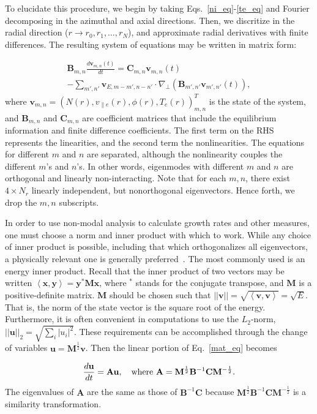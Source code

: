 \documentclass[letter,scriptaddress,twocolumn, prl,showkeys]{revtex4}
\def\beq{\begin{equation}}
\def\eeq{\end{equation}}
\def\beqar{\begin{eqnarray}}
\def\eeqar{\end{eqnarray}}
\newcommand{\diff}[2]{\frac{d#1}{d#2}}
\def\grad{\nabla}
\newcommand{\gradperp}{\grad_\perp}
\newcommand{\vpe}{v_{\parallel e}}
\begin{document}
To elucidate this procedure, we begin by taking Eqs.~\ref{ni_eq}-\ref{te_eq} and Fourier decomposing in the azimuthal and axial directions.
Then, we discritize in the radial direction ($r \rightarrow r_0, r_1, \ldots, r_N $), and approximate radial derivatives with finite differences. 
The resulting system of equations may be written in matrix form:

\beqar
\label{mat_eq}
\mathbf{B}_{m,n} \diff{\mathbf{v}_{m,n}(t)}{t} = \mathbf{C}_{m,n} \mathbf{v}_{m,n}(t) \nonumber \\
- \sum_{m',n'}  \mathbf{v}_{E,m-m',n-n'} \cdot \gradperp \left( \mathbf{B}_{m',n'} \mathbf{v}_{m',n'}(t) \right),
\eeqar
where $\mathbf{v}_{m,n} = \left( N(r), \vpe(r), \phi(r), T_e(r) \right)_{m,n}^{T}$ is the state of the system,
and $\mathbf{B}_{m,n}$ and $\mathbf{C}_{m,n}$ are coefficient matrices that include the equilibrium information and finite difference coefficients. The first term on the RHS represents the linearities,
and the second term the nonlinearities.
The equations for different $m$ and $n$ are separated, although the nonlinearity couples the different $m$'s and $n$'s. 
In other words, eigenmodes with different $m$ and $n$ are orthogonal and linearly non-interacting. Note that for each $m,n$, there exist $4 \times N_r$ linearly
independent, but nonorthogonal eigenvectors. Hence forth, we drop the $m,n$ subscripts.

In order to use non-modal analysis to calculate growth rates and other measures, one must choose a norm and inner product with which to work. While any choice of
inner product is possible, including that which orthogonalizes all eigenvectors, a physically relevant one is generally preferred~\cite{camargo1998,schmid2007,camporeale2010}. The most commonly used
is an energy inner product. Recall that the inner product of two vectors may be written $\left< \mathbf{x},\mathbf{y} \right> = \mathbf{y}^{*} \mathbf{M} \mathbf{x}$,
where $^*$ stands for the conjugate transpose, and $\mathbf{M}$ is a positive-definite matrix. $\mathbf{M}$ should be chosen such that 
$||\mathbf{v}|| = \sqrt{\left< \mathbf{v},\mathbf{v} \right>} = \sqrt{E}$. That is, the norm of the state vector is the square root of the energy. Furthermore, it is often convenient in
computations to use the $L_2$-norm, $||\mathbf{u}||_2 = \sqrt{\sum_i |u_i|^2}$. These requirements can be accomplished through the change of variables $\mathbf{u} = \mathbf{M}^{\frac{1}{2}} \mathbf{v}$.
Then the linear portion of Eq.~\ref{mat_eq} becomes

\beq
\label{lin_eq_A}
\diff{\mathbf{u}}{t} = \mathbf{A} \mathbf{u},  \quad \rm{where} \ \mathbf{A} = \mathbf{M}^{\frac{1}{2}} \mathbf{B}^{-1} \mathbf{C} \mathbf{M}^{-\frac{1}{2}}.
\eeq
The eigenvalues of $\mathbf{A}$ are the same as those of $\mathbf{B}^{-1} \mathbf{C}$ because $\mathbf{M}^{\frac{1}{2}} \mathbf{B}^{-1} \mathbf{C} \mathbf{M}^{-\frac{1}{2}}$ is a similarity transformation.
\end{document}
